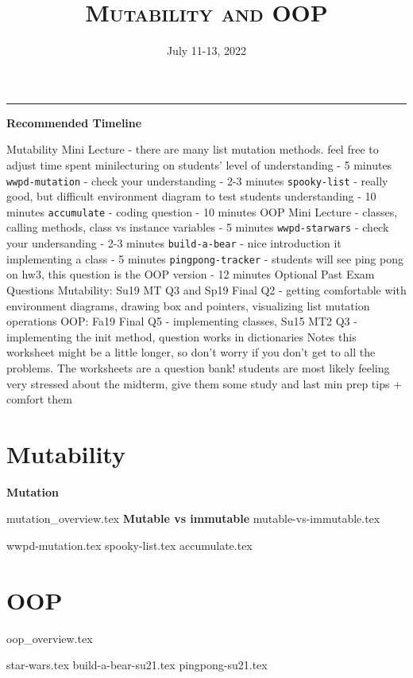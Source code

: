 \documentclass{exam}
\title{\textsc{Mutability and OOP}}
\date{July 11-13, 2022}
\begin{document}
	\maketitle
	\rule{\textwidth}{0.15em}
	\fontsize{12}{15}\selectfont

\begin{guide}
	\textbf{Recommended Timeline}
	\begin{outline}[enumerate]
		\1 Mutability Mini Lecture - there are many list mutation methods. feel free to adjust time spent minilecturing on students' level of understanding - 5 minutes
		\1 \lstinline{wwpd-mutation} - check your understanding - 2-3 minutes
		\1 \lstinline{spooky-list} - really good, but difficult environment diagram to test students understanding - 10 minutes
		\1 \lstinline{accumulate} - coding question - 10 minutes
		\1 OOP Mini Lecture - classes, calling methods, class vs instance variables - 5 minutes
		\1 \lstinline{wwpd-starwars} - check your undersanding - 2-3 minutes
		\1 \lstinline{build-a-bear} - nice introduction it implementing a class - 5 minutes 
		\1 \lstinline{pingpong-tracker} - students will see ping pong on hw3, this question is the OOP version - 12 minutes
		\1 Optional Past Exam Questions
		\2 Mutability: Su19 MT Q3 and Sp19 Final Q2 - getting comfortable with environment diagrams, drawing box and pointers, visualizing list mutation operations
		\2 OOP: Fa19 Final Q5 - implementing classes, Su15 MT2 Q3 - implementing the init method, question works in dictionaries
		\1 Notes
		\2 this worksheet might be a little longer, so don't worry if you don't get to all the problems. The worksheets are a question bank!
		\2 students are most likely feeling very stressed about the midterm, give them some study and last min prep tips + comfort them
	\end{outline}
\end{guide}

\section{Mutability}
\textbf{Mutation}

{mutation_overview.tex}
\textbf{Mutable vs immutable}
{mutable-vs-immutable.tex}
\begin{questions}
{wwpd-mutation.tex}
\newpage
{spooky-list.tex}
\newpage
{accumulate.tex}
\end{questions}

\newpage
\section{OOP}
{oop_overview.tex}
\newpage
\begin{questions}
{star-wars.tex}
\newpage
{build-a-bear-su21.tex}
{pingpong-su21.tex}
\end{questions}
\end{document}
